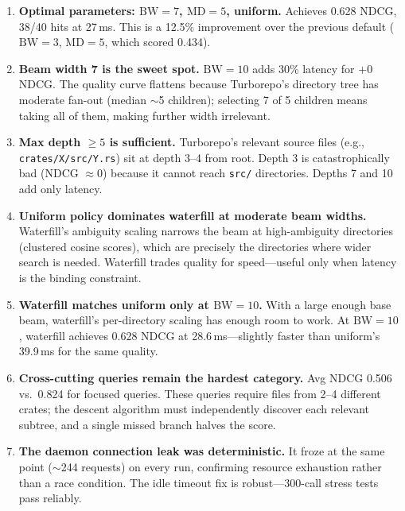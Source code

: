 \documentclass[11pt,a4paper]{article}
\begin{document}
\begin{enumerate}[nosep]
    \item \textbf{Optimal parameters: $\mathrm{BW}=7$, $\mathrm{MD}=5$, uniform.} Achieves 0.628 NDCG, 38/40 hits at 27\,ms. This is a 12.5\% improvement over the previous default ($\mathrm{BW}=3$, $\mathrm{MD}=5$, which scored 0.434).

    \item \textbf{Beam width 7 is the sweet spot.} $\mathrm{BW}=10$ adds 30\% latency for $+0$ NDCG. The quality curve flattens because Turborepo's directory tree has moderate fan-out (median $\sim$5 children); selecting 7 of 5 children means taking all of them, making further width irrelevant.

    \item \textbf{Max depth $\geq 5$ is sufficient.} Turborepo's relevant source files (e.g., \texttt{crates/X/src/Y.rs}) sit at depth 3--4 from root. Depth 3 is catastrophically bad (NDCG $\approx 0$) because it cannot reach \texttt{src/} directories. Depths 7 and 10 add only latency.

    \item \textbf{Uniform policy dominates waterfill at moderate beam widths.} Waterfill's ambiguity scaling narrows the beam at high-ambiguity directories (clustered cosine scores), which are precisely the directories where wider search is needed. Waterfill trades quality for speed---useful only when latency is the binding constraint.

    \item \textbf{Waterfill matches uniform only at $\mathrm{BW}=10$.} With a large enough base beam, waterfill's per-directory scaling has enough room to work. At $\mathrm{BW}=10$, waterfill achieves 0.628 NDCG at 28.6\,ms---slightly faster than uniform's 39.9\,ms for the same quality.

    \item \textbf{Cross-cutting queries remain the hardest category.} Avg NDCG 0.506 vs.\ 0.824 for focused queries. These queries require files from 2--4 different crates; the descent algorithm must independently discover each relevant subtree, and a single missed branch halves the score.

    \item \textbf{The daemon connection leak was deterministic.} It froze at the same point ($\sim$244 requests) on every run, confirming resource exhaustion rather than a race condition. The idle timeout fix is robust---300-call stress tests pass reliably.
\end{enumerate}
\end{document}
